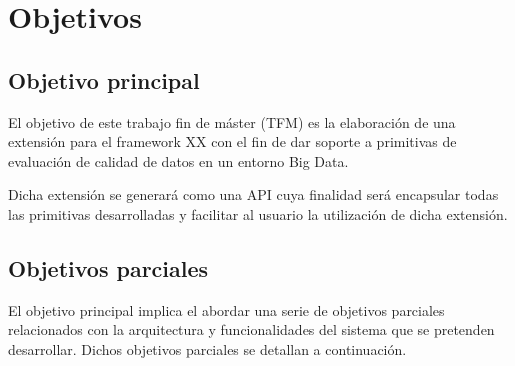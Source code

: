 \chapter{Objetivos}
\label{chap:objetivos}

\section{Objetivo principal}

El objetivo de este trabajo fin de máster (\acf{TFM}) es la elaboración de una
extensión para el framework XX con el fin de dar soporte a primitivas de evaluación de
calidad de datos en un entorno Big Data.

Dicha extensión se generará como una \acs{API} cuya finalidad será encapsular todas
las primitivas desarrolladas y facilitar al usuario la utilización de dicha
extensión. 

\section{Objetivos parciales}

El objetivo principal implica el abordar una serie de objetivos parciales
relacionados con la arquitectura y funcionalidades del sistema que se pretenden
desarrollar. Dichos objetivos parciales se detallan a continuación. 


